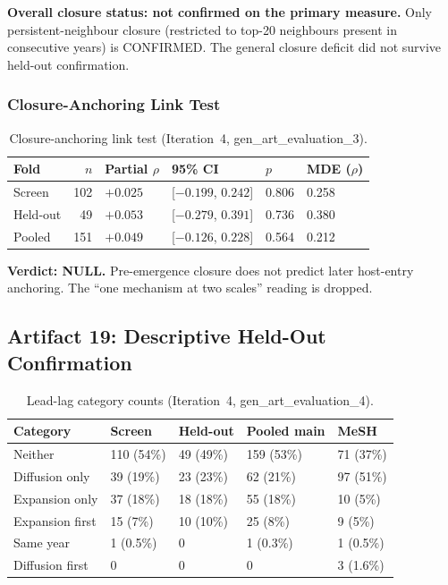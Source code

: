 \documentclass[11pt,letterpaper]{article}
\begin{document}
\textbf{Overall closure status: not confirmed on the primary measure.} Only persistent-neighbour closure (restricted to top-20 neighbours present in consecutive years) is CONFIRMED. The general closure deficit did not survive held-out confirmation.

\subsubsection{Closure-Anchoring Link Test}

\begin{table}[!htbp]
\centering
\caption{Closure-anchoring link test (Iteration~4, gen\_art\_evaluation\_3).}
\label{tab:d3_link}
\begin{tabular}{lrR{1.5cm}L{3cm}R{1.3cm}R{1.3cm}}
\toprule
Fold & $n$ & Partial $\rho$ & 95\% CI & $p$ & MDE ($\rho$) \\
\midrule
Screen & 102 & $+0.025$ & [$-0.199$, $0.242$] & 0.806 & 0.258 \\
Held-out & 49 & $+0.053$ & [$-0.279$, $0.391$] & 0.736 & 0.380 \\
Pooled & 151 & $+0.049$ & [$-0.126$, $0.228$] & 0.564 & 0.212 \\
\bottomrule
\end{tabular}
\end{table}

\textbf{Verdict: NULL.} Pre-emergence closure does not predict later host-entry anchoring. The ``one mechanism at two scales'' reading is dropped.

\subsection{Artifact 19: Descriptive Held-Out Confirmation}

\begin{table}[!htbp]
\centering
\caption{Lead-lag category counts (Iteration~4, gen\_art\_evaluation\_4).}
\label{tab:leadlag}
{\small
\begin{tabular}{L{2.5cm}R{1.6cm}R{1.6cm}R{1.8cm}R{1.5cm}}
\toprule
Category & Screen & Held-out & Pooled main & MeSH \\
\midrule
Neither & 110 (54\%) & 49 (49\%) & 159 (53\%) & 71 (37\%) \\
Diffusion only & 39 (19\%) & 23 (23\%) & 62 (21\%) & 97 (51\%) \\
Expansion only & 37 (18\%) & 18 (18\%) & 55 (18\%) & 10 (5\%) \\
Expansion first & 15 (7\%) & 10 (10\%) & 25 (8\%) & 9 (5\%) \\
Same year & 1 (0.5\%) & 0 & 1 (0.3\%) & 1 (0.5\%) \\
Diffusion first & 0 & 0 & 0 & 3 (1.6\%) \\
\bottomrule
\end{tabular}
}
\end{table}
\end{document}
